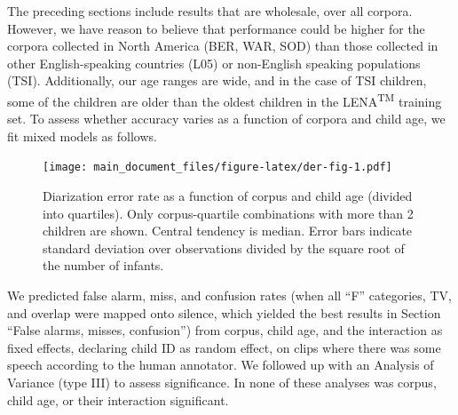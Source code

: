 \documentclass[english,floatsintext,man]{apa6}
\begin{document}
The preceding sections include results that are wholesale, over all
corpora. However, we have reason to believe that performance could be
higher for the corpora collected in North America (BER, WAR, SOD) than
those collected in other English-speaking countries (L05) or non-English
speaking populations (TSI). Additionally, our age ranges are wide, and
in the case of TSI children, some of the children are older than the
oldest children in the LENA\textsuperscript{TM} training set. To assess
whether accuracy varies as a function of corpora and child age, we fit
mixed models as follows.

\begin{figure}
\centering
\texttt{[image: main\_document\_files/figure-latex/der-fig-1.pdf]}
\caption{\label{fig:der-fig}Diarization error rate as a function of corpus
and child age (divided into quartiles). Only corpus-quartile
combinations with more than 2 children are shown. Central tendency is
median. Error bars indicate standard deviation over observations divided
by the square root of the number of infants.}
\end{figure}

We predicted false alarm, miss, and confusion rates (when all
\enquote{F} categories, TV, and overlap were mapped onto silence, which
yielded the best results in Section \enquote{False alarms, misses,
confusion}) from corpus, child age, and the interaction as fixed
effects, declaring child ID as random effect, on clips where there was
some speech according to the human annotator. We followed up with an
Analysis of Variance (type III) to assess significance. In none of these
analyses was corpus, child age, or their interaction significant.
\end{document}
